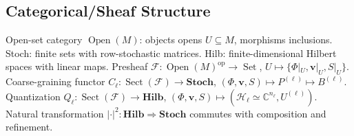 \documentclass[11pt]{article}
\theoremstyle{plain}
\theoremstyle{definition}
\begin{document}
\subsection{Categorical/Sheaf Structure}
Open-set category $\operatorname{Open}(M)$: objects opens $U \subseteq M$, morphisms inclusions.
Stoch: finite sets with row-stochastic matrices.
Hilb: finite-dimensional Hilbert spaces with linear maps.
Presheaf $\mathcal{F}: \operatorname{Open}(M)^{\mathrm{op}} \to \operatorname{Set}$, $U \mapsto \{\Phi|_U, \bm{v}|_U, S|_U\}$.
Coarse-graining functor $C_\ell: \operatorname{Sect}(\mathcal{F}) \to \mathbf{Stoch}$, $(\Phi, \bm{v}, S) \mapsto P^{(\ell)} \mapsto B^{(\ell)}$.
Quantization $Q_\ell: \operatorname{Sect}(\mathcal{F}) \to \mathbf{Hilb}$, $(\Phi, \bm{v}, S) \mapsto (\mathcal{H}_\ell \simeq \mathbb{C}^{n_\ell}, U^{(\ell)})$.
Natural transformation $|\cdot|^2: \mathbf{Hilb} \Rightarrow \mathbf{Stoch}$ commutes with composition and refinement.


\end{document}
